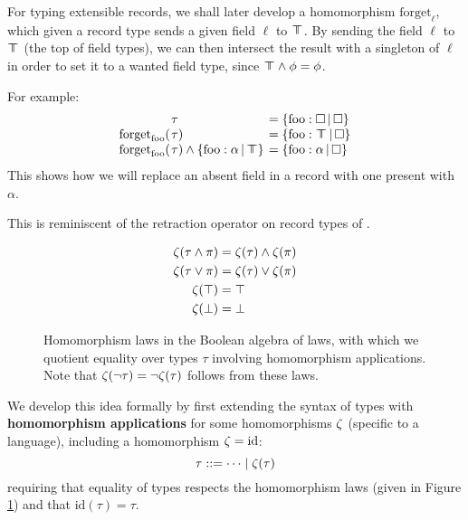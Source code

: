 \begin{example}
    For typing extensible records, we shall later develop a homomorphism $\mathrm{forget}_\ell$, which given a record type sends a given field $\ell$ to $\top \!\!\!\! \top$.
    By sending the field $\ell$ to $\top \!\!\!\! \top$ (the top of field types), we can then intersect the result with a singleton of $\ell$ in order to set it to a wanted field type, since $\top \!\!\!\! \top \land \phi = \phi$. 
    
    For example:
    \setlength{\tabcolsep}{0pt}
    $$\begin{array}{rll}
        &\hspace{-0.9em}\tau &\;\hspace{-0.9em}= \flext{\mathrm{foo}: \flabsent}{\flabsent} \\
        \mathrm{forget}_\mathrm{foo}( &\hspace{-0.9em}\tau ) &\;\hspace{-0.9em}= \flext{\mathrm{foo}: \flftop}{\flabsent} \\
        \mathrm{forget}_\mathrm{foo}( &\hspace{-0.9em}\tau ) \meet \flext{\mathrm{foo}: \alpha}{\flftop} &\;\hspace{-0.9em}= \flext{\mathrm{foo}: \alpha}{\flabsent}
    \end{array}$$
    This shows how we will replace an absent field in a record with one present with $\alpha$.

    This is reminiscent of the retraction operator on record types of \textcite{operations-on-records}.
\end{example}

\begin{figure}
    \centering
    \begin{align*}
        \zeta(\tau \land \pi) &= \zeta(\tau) \land \zeta(\pi) \\
        \zeta(\tau \lor \pi) &= \zeta(\tau) \lor \zeta(\pi) \\
        \zeta(\top) &= \top \\
        \zeta(\bot) &= \bot
    \end{align*}
    \caption{Homomorphism laws in the Boolean algebra of laws, with which we quotient equality over types $\tau$ involving homomorphism applications. Note that $\zeta(\lnot \tau) = \lnot \zeta(\tau)$ follows from these laws.}
    \label{fig:morphism-laws}
\end{figure}

We develop this idea formally by first extending the syntax of types with \textbf{homomorphism applications} for some homomorphisms $\zeta$ (specific to a language), including a homomorphism $\zeta = \mathrm{id}$:
$$ \tau ::= \cdots \mid \zeta(\tau) $$
requiring that equality of types respects the homomorphism laws (given in Figure \ref{fig:morphism-laws}) and that $\mathrm{id}(\tau) = \tau$. 

